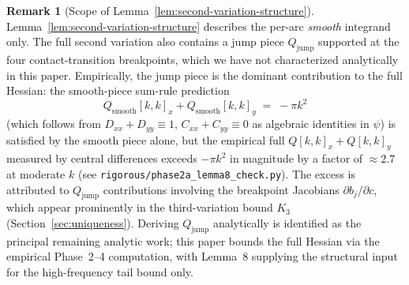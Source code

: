 \documentclass[11pt]{amsart}
\theoremstyle{plain}
\theoremstyle{definition}
\newtheorem{remark}[theorem]{Remark}
\begin{document}
\begin{remark}[Scope of Lemma~\ref{lem:second-variation-structure}]
Lemma~\ref{lem:second-variation-structure} describes the
per-arc \emph{smooth} integrand only.  The full second variation
also contains a jump piece $Q_{\mathrm{jump}}$ supported at the
four contact-transition breakpoints, which we have not
characterized analytically in this paper.  Empirically, the
jump piece is the dominant contribution to the full Hessian:
the smooth-piece sum-rule prediction
\[
   Q_{\mathrm{smooth}}[k,k]_{x} + Q_{\mathrm{smooth}}[k,k]_{y}
   \;=\; -\pi k^{2}
\]
(which follows from $D_{xx} + D_{yy} \equiv 1$, $C_{xx} + C_{yy}
\equiv 0$ as algebraic identities in $\psi$) is satisfied by the
smooth piece alone, but the empirical full $Q[k,k]_{x} +
Q[k,k]_{y}$ measured by central differences exceeds $-\pi k^{2}$
in magnitude by a factor of $\approx 2.7$ at moderate $k$ (see
\texttt{rigorous/phase2a\_lemma8\_check.py}).  The excess is
attributed to $Q_{\mathrm{jump}}$ contributions involving the
breakpoint Jacobians $\partial b_{j}/\partial c$, which appear
prominently in the third-variation bound $K_{3}$
(Section~\ref{sec:uniqueness}).  Deriving $Q_{\mathrm{jump}}$
analytically is identified as the principal remaining
analytic work; this paper bounds the full Hessian via the
empirical Phase~2--4 computation, with Lemma~8 supplying the
structural input for the high-frequency tail bound only.
\end{remark}
\end{document}
